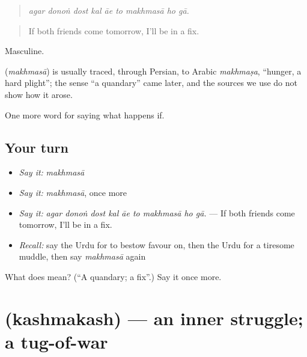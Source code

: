 \begin{quote}
        
\end{quote}

\begin{quote}
\emph{agar donoṅ dost kal āe to makhmasā ho gā.}
\end{quote}

\begin{quote}
If both friends come tomorrow, I'll be in a fix.
\end{quote}

Masculine.

\begin{cousinweb}
\textbf{} (\emph{makhmasā}) is usually traced, through Persian, to Arabic \emph{makhmaṣa}, \textquotedblleft{}hunger, a hard plight\textquotedblright{}; the sense \textquotedblleft{}a quandary\textquotedblright{} came later, and the sources we use do not show how it arose.
\end{cousinweb}

\begin{grammarlens}[title={What you've built}]
One more word for saying what happens if.
\end{grammarlens}

\subsection*{Your turn}
\begin{itemize}
\raggedright
  \item \emph{Say it:} \emph{makhmasā}
  \item \emph{Say it:} \emph{makhmasā}, once more
  \item \emph{Say it:} \emph{agar donoṅ dost kal āe to makhmasā ho gā.} — If both friends come tomorrow, I'll be in a fix.
  \item \emph{Recall:} say the Urdu for to bestow favour on, then the Urdu for a tiresome muddle, then say \emph{makhmasā} again
\end{itemize}

\begin{tcolorbox}[breakable,colback=teal!4,colframe=teal!35!black,title={Before you move on}]
What does  mean? (\textquotedblleft{}A quandary; a fix\textquotedblright{}.) Say it once more.
\end{tcolorbox}
\section[\texorpdfstring{\ur{کشمکش} (kashmakash)}{کشمکش (kashmakash)}]{ (kashmakash) — an inner struggle; a tug-of-war}

